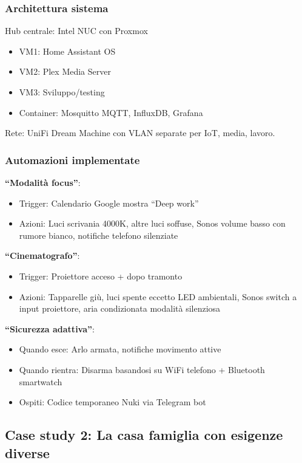 \subsubsection{Architettura sistema}

Hub centrale: Intel NUC con Proxmox
\begin{itemize}
    \item VM1: Home Assistant OS
    \item VM2: Plex Media Server  
    \item VM3: Sviluppo/testing
    \item Container: Mosquitto MQTT, InfluxDB, Grafana
\end{itemize}

Rete: UniFi Dream Machine con VLAN separate per IoT, media, lavoro.

\subsubsection{Automazioni implementate}

\textbf{``Modalità focus''}:
\begin{itemize}
    \item Trigger: Calendario Google mostra ``Deep work''
    \item Azioni: Luci scrivania 4000K, altre luci soffuse, Sonos volume basso con rumore bianco, notifiche telefono silenziate
\end{itemize}

\textbf{``Cinematografo''}:
\begin{itemize}
    \item Trigger: Proiettore acceso + dopo tramonto
    \item Azioni: Tapparelle giù, luci spente eccetto LED ambientali, Sonos switch a input proiettore, aria condizionata modalità silenziosa
\end{itemize}

\textbf{``Sicurezza adattiva''}:
\begin{itemize}
    \item Quando esce: Arlo armata, notifiche movimento attive
    \item Quando rientra: Disarma basandosi su WiFi telefono + Bluetooth smartwatch
    \item Ospiti: Codice temporaneo Nuki via Telegram bot
\end{itemize}

\subsection{Case study 2: La casa famiglia con esigenze diverse}

